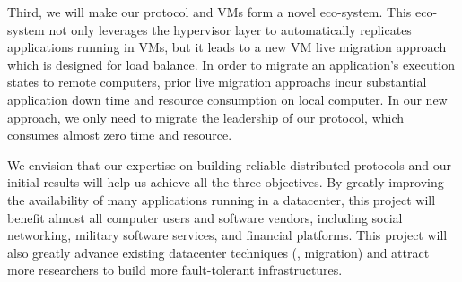 
Third, we will make our protocol and VMs form a novel eco-system. This 
eco-system not only leverages the hypervisor layer to automatically replicates 
applications running in VMs, but it leads to a new VM live migration approach 
which is designed for load balance. In order to migrate an application's 
execution states to remote computers, prior live migration approachs incur 
substantial application down time and resource consumption on local computer. 
In 
our new approach, we only need to migrate the leadership of our protocol, which 
consumes almost zero time and resource.


We envision that our expertise on building reliable distributed protocols and 
our initial results will help us achieve all the three objectives. By greatly 
improving the availability of many applications running in a datacenter, this 
project will benefit almost all computer users and software vendors, including 
social networking, military software services, and financial platforms. This 
project will also greatly advance existing datacenter techniques (\eg, 
migration) and attract more researchers to build more fault-tolerant 
infrastructures.
